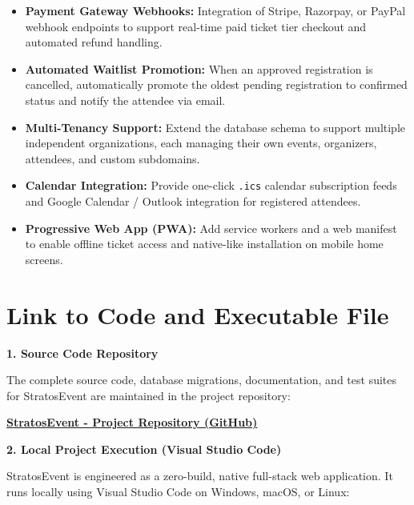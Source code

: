 \documentclass[11pt,a4paper]{article}
\begin{document}
\begin{itemize}[leftmargin=*]
    \item \textbf{Payment Gateway Webhooks:} Integration of Stripe, Razorpay, or PayPal webhook endpoints to support real-time paid ticket tier checkout and automated refund handling.
    \item \textbf{Automated Waitlist Promotion:} When an approved registration is cancelled, automatically promote the oldest pending registration to confirmed status and notify the attendee via email.
    \item \textbf{Multi-Tenancy Support:} Extend the database schema to support multiple independent organizations, each managing their own events, organizers, attendees, and custom subdomains.
    \item \textbf{Calendar Integration:} Provide one-click \texttt{.ics} calendar subscription feeds and Google Calendar / Outlook integration for registered attendees.
    \item \textbf{Progressive Web App (PWA):} Add service workers and a web manifest to enable offline ticket access and native-like installation on mobile home screens.
\end{itemize}

\newpage
\section*{{\color{TitleBlue}\bfseries
\fontsize{18}{22}\selectfont Link to Code and Executable File}}

\vspace{0.10in}

\noindent
\textbf{1. Source Code Repository}

The complete source code, database migrations, documentation, and test suites for StratosEvent are maintained in the project repository:

\begin{center}
\href{https://github.com/stratosevent/stratosevent}
{\textbf{StratosEvent - Project Repository (GitHub)}}
\end{center}

\vspace{0.15in}
\noindent
\textbf{2. Local Project Execution (Visual Studio Code)}

StratosEvent is engineered as a zero-build, native full-stack web application. It runs locally using Visual Studio Code on Windows, macOS, or Linux:
\end{document}
